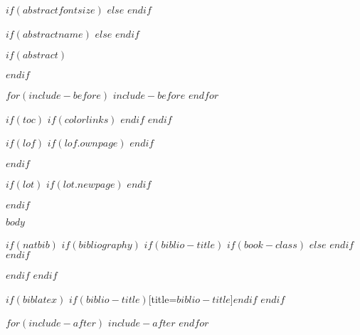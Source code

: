 \documentclass[
  $if(fontsize)$$fontsize$,$endif$
  $if(lang)$$babel-lang$,$endif$
  $if(papersize)$$papersize$paper,$endif$
  $for(classoption)$$classoption$$sep$,$endfor$]{article}
\renewcommand{\normalfont}{\mymainfont}
\newcommand*{\supersectsize}{\$supersection.size$}
\newcommand*{\supersectsize}{\Large}
\newcommand*{\supersectseries}{\$supersection.series$}
\newcommand*{\supersectseries}{\bfseries}
\newcommand*{\supersection}[1]{\label{ #1}\noindent\supersectsize\supersectseries #1}
\newcommand*{\supersection}[1]{\label{ #1}\noindent\Large\bfseries #1}
\begin{document}
\normalfont

\newpage
\pagestyle{plain}

$if(abstractfontsize)$
$else$
  \patchcmd{\abstract}{\small}{\large}{}{}
$endif$

$if(abstractname)$
  \renewcommand{\abstractname}{\supersection{$abstractname$}\\ \vspace{0.5cm}}
$else$
  \renewcommand{\abstractname}{\supersection{Abstract}\\ \vspace{0.5cm}}
$endif$

$if(abstract)$
  \begin{abstract}
    \noindent $abstract$
  \end{abstract}
  \newpage
$endif$

$for(include-before)$
  $include-before$
$endfor$

$if(toc)$
  {
    $if(colorlinks)$
      \hypersetup{linkcolor=$if(toccolor)$$toccolor$$else$black$endif$}
    $endif$
    \newpage
    \setcounter{tocdepth}{$toc-depth$}
    \tableofcontents
  }
$endif$

$if(lof)$
  $if(lof.ownpage)$
    \newpage
  $endif$
  \listoffigures
$endif$

$if(lot)$
  $if(lot.newpage)$
    \newpage
  $endif$
  \listoftables
$endif$

\normalfont
\newpage
{}

$body$

$if(natbib)$
  $if(bibliography)$
    $if(biblio-title)$
      $if(book-class)$
        \renewcommand\bibname{$biblio-title$}
      $else$
        \renewcommand\refname{$biblio-title$}
      $endif$
    $endif$
    \newpage
    
  $endif$
$endif$

$if(biblatex)$
  \newpage
  \printbibliography$if(biblio-title)$[title=$biblio-title$]$endif$
$endif$

$for(include-after)$
  $include-after$
$endfor$
\end{document}
